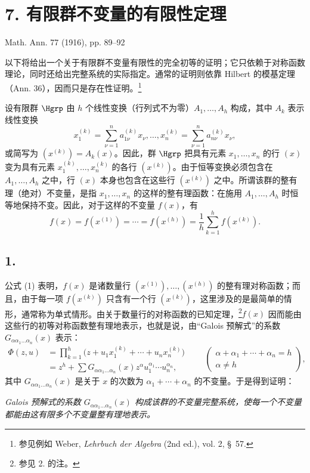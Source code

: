 \section*{7. 有限群不变量的有限性定理}
\begin{center}
Math. Ann. 77 (1916), pp. 89--92
\end{center}

以下将给出一个关于有限群不变量有限性的完全初等的证明；它只依赖于对称函数理论，同时还给出完整系统的实际指定。通常的证明则依靠 Hilbert 的模基定理（Ann. 36），因而只是存在性证明。\footnote{参见例如 Weber, \emph{Lehrbuch der Algebra} (2nd ed.), vol. 2, \S\ 57.}

设有限群 $\Hgrp$ 由 $h$ 个线性变换（行列式不为零）$A_1,\ldots,A_h$ 构成，其中 $A_k$ 表示线性变换
\[
  x_1^{(k)}=\sum_{\nu=1}^{n}a_{1\nu}^{(k)}x_\nu,\ldots,
  x_n^{(k)}=\sum_{\nu=1}^{n}a_{n\nu}^{(k)}x_\nu,
\]
或简写为 $(x^{(k)})=A_k(x)$。因此，群 $\Hgrp$ 把具有元素 $x_1,\ldots,x_n$ 的行 $(x)$ 变为具有元素 $x_1^{(k)},\ldots,x_n^{(k)}$ 的各行 $(x^{(k)})$。由于恒等变换必须包含在 $A_1,\ldots,A_h$ 之中，行 $(x)$ 本身也包含在这些行 $(x^{(k)})$ 之中。所谓该群的整有理（绝对）不变量，是指 $x_1,\ldots,x_n$ 的这样的整有理函数：在施用 $A_1,\ldots,A_h$ 时恒等地保持不变。因此，对于这样的不变量 $f(x)$，有
\begin{equation}
  f(x)=f(x^{(1)})=\cdots=f(x^{(h)})=
  \frac1h\sum_{k=1}^{h}f(x^{(k)}).
\tag{1}
\end{equation}

\subsection*{1.}
公式 (1) 表明，$f(x)$ 是诸数量行 $(x^{(1)}),\ldots,(x^{(h)})$ 的整有理对称函数；而且，由于每一项 $f(x^{(k)})$ 只含有一个行 $(x^{(k)})$，这里涉及的是最简单的情形，通常称为单式情形。由关于数量行的对称函数的已知定理，\footnote{参见 2. 的注。}$f(x)$ 因而能由这些行的初等对称函数整有理地表示，也就是说，由“Galois 预解式”的系数 $G_{\alpha\alpha_1\ldots\alpha_n}(x)$ 表示：
\[
\begin{aligned}
  \Phi(z,u)
  &=\prod_{k=1}^{h}\bigl(z+u_1x_1^{(k)}+\cdots+u_nx_n^{(k)}\bigr) \\
  &=z^h+
    \sum G_{\alpha\alpha_1\ldots\alpha_n}(x)
    z^{\alpha}u_1^{\alpha_1}\cdots u_n^{\alpha_n},
\end{aligned}
\qquad
\left(\begin{array}{c}
\alpha+\alpha_1+
\cdots+
\alpha_n=h\\
\alpha\ne h
\end{array}\right),
\]
其中 $G_{\alpha\alpha_1\ldots\alpha_n}(x)$ 是关于 $x$ 的次数为 $\alpha_1+\cdots+\alpha_n$ 的不变量。于是得到证明：

\emph{Galois 预解式的系数 $G_{\alpha\alpha_1\ldots\alpha_n}(x)$ 构成该群的不变量完整系统，使每一个不变量都能由这有限多个不变量整有理地表示。}

